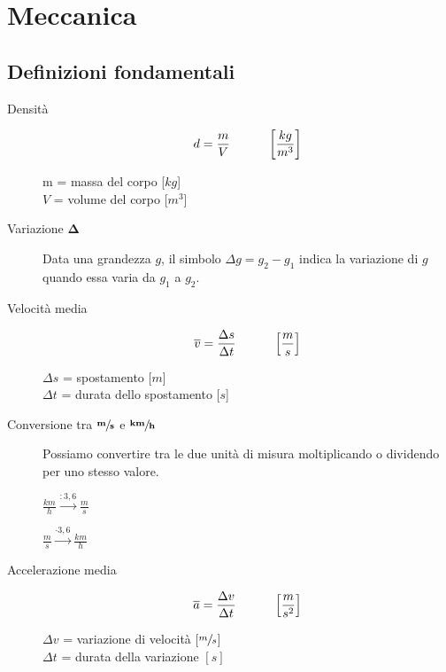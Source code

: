 \documentclass[a4paper,11pt,italian]{article}
\begin{document}
\newpage
\section{Meccanica}

\subsection{Definizioni fondamentali}

\begin{description}
  \item[Densità] 
  \[ d = \frac{m}{V} \hspace*{3em} \left[ \frac{kg}{m^3} \right] \]
  \begin{multicols}{2}
  m = massa del corpo [$ kg $]\\
  $ V $ = volume del corpo [$ m^3 $]
  \end{multicols}
  
  \item[Variazione $ \mathbf{\Delta} $] 
  Data una grandezza $ g $, il simbolo $ \Delta g = g_2 - g_1 $ indica la variazione di $ g $ quando essa varia da $ g_1 $ a $ g_2 $.
  
  \item[Velocità media]
  \[ \overline{v} = \frac{\Delta s}{\Delta t} \hspace*{3em} \left[ \frac{m}{s} \right] \]
  \begin{multicols}{2}
  $ \Delta s $ = spostamento [$ m $]\\
  $ \Delta t $ = durata dello spostamento [$ s $]
  \end{multicols}
  
  \item[Conversione tra $ \sfrac{\mathbf{m}}{\mathbf{s}} $ e $ \sfrac{\mathbf{km}}{\mathbf{h}} $] 
  Possiamo convertire tra le due unità di misura moltiplicando o dividendo per uno stesso valore.
  \begin{multicols}{2}\begin{center}
  $ \frac{km}{h} \xrightarrow{: 3,6} \frac{m}{s} $
   
  $ \frac{m}{s} \xrightarrow{\cdot 3,6} \frac{km}{h} $
  \end{center}\end{multicols}
  
  \item[Accelerazione media] 
  \[ \overline{a} = \frac{\Delta v}{\Delta t} \hspace*{3em} \left[ \frac{m}{s^2} \right]  \]
  \begin{multicols}{2}
  $ \Delta v $ = variazione di velocità [$ \sfrac{m}{s}$]\\
  $ \Delta t $ = durata della variazione $ [s] $
  \end{multicols}
  

\end{description}
\end{document}
